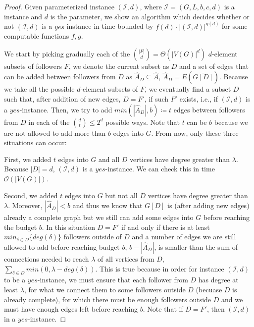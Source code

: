 \begin{proof}\label{proof:XPd}
    Given parameterized instance $(\mathcal{I}, d)$, where $\mathcal{I} = (G, L, b, c, d)$ is a \HLdeg instance and $d$ is the parameter,
    we show an algorithm which decides whether or not $(\mathcal{I}, d)$ is a $yes$-instance in time bounded by
    $f(d) \cdot |(\mathcal{I}, d)|^{g(d)}$ for some computable functions $f,g$.

    We start by picking gradually each of the $\binom{|F|}{d} = \Theta(|V(G)|^d)$ $d$-element subsets of followers $F$,
    we denote the current subset as $D$ and a set of edges that can be added between followers from $D$
    as $\hat{A}_D \subseteq \hat{A}$, $\hat{A}_D = E(\overline{G[D]})$.
    Because we take all the possible $d$-element subsets of $F$, we eventually find a subset $D$ such that,
    after addition of new edges, $D = F'$,
    if such $F'$ exists, i.e., if $(\mathcal{I}, d)$ is a $yes$-instance.
    Then, we try to add $min(|\hat{A}_D|, b) \coloneqq t$ edges between followers from $D$ in each of the $\binom{d}{t} \leq 2^d$ possible ways.
    Note that $t$ can be $b$ because we are not allowed to add more than $b$ edges into $G$.
    From now, only these three situations can occur:

    First, we added $t$ edges into $G$ and all $D$ vertices have degree greater than $\lambda$.
    Because $|D| = d$, $(\mathcal{I}, d)$ is a $yes$-instance.
    We can check this in time $\mathcal{O}(|V(G)|)$.
    
    Second, we added $t$ edges into $G$ but not all $D$ vertices have degree greater than $\lambda$.
    Moreover, $|\hat{A}_D| < b$ and thus we know that $G[D]$ is (after adding new edges) already a complete graph
    but we still can add some edges into $G$ before reaching the budget $b$. 
    In this situation $D = F'$ if and only if there is at least $min_{\delta \in D}\{deg(\delta)\}$ followers
    outside of $D$ and a number of edges we are still allowed to add before reaching budget $b$, $b - |\hat{A}_D|$,
    is smaller than the sum of connections needed to reach $\lambda$ of all vertices from $D$,
    $\sum_{\delta \in D} min(0, \lambda - deg(\delta))$.
    This is true because in order for instance $(\mathcal{I}, d)$ to be a $yes$-instance, we must
    ensure that each follower from $D$ has degree at least $\lambda$, for what we connect them to some followers
    outside $D$ (becuase $D$ is already complete), for which there must be enough followers outside $D$ and
    we must have enough edges left before reaching $b$.
    Note that if $D = F'$, then $(\mathcal{I}, d)$ in a $yes$-instance.
    

\end{proof}
